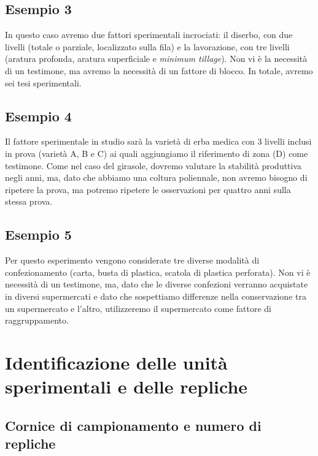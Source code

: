 \documentclass[a4paper,12pt,oneside]{book}
\theoremstyle{definition}
\theoremstyle{definition}
\theoremstyle{definition}
\theoremstyle{remark}
\begin{document}
\subsection{Esempio 3}\label{esempio-3}

In questo caso avremo due fattori sperimentali incrociati: il diserbo,
con due livelli (totale o parziale, localizzato sulla fila) e la
lavorazione, con tre livelli (aratura profonda, aratura superficiale e
\emph{minimum tillage}). Non vi è la necessità di un testimone, ma
avremo la necessità di un fattore di blocco. In totale, avremo sei tesi
sperimentali.

\subsection{Esempio 4}\label{esempio-4}

Il fattore sperimentale in studio sarà la varietà di erba medica con 3
livelli inclusi in prova (varietà A, B e C) ai quali aggiungiamo il
riferimento di zona (D) come testimone. Come nel caso del girasole,
dovremo valutare la stabilità produttiva negli anni, ma, dato che
abbiamo una coltura poliennale, non avremo bisogno di ripetere la prova,
ma potremo ripetere le osservazioni per quattro anni sulla stessa prova.

\subsection{Esempio 5}\label{esempio-5}

Per questo esperimento vengono considerate tre diverse modalità di
confezionamento (carta, busta di plastica, scatola di plastica
perforata). Non vi è necessità di un testimone, ma, dato che le diverse
confezioni verranno acquistate in diversi supermercati e dato che
sospettiamo differenze nella conservazione tra un supermercato e
l'altro, utilizzeremo il supermercato come fattore di raggruppamento.

\section{Identificazione delle unità sperimentali e delle
repliche}\label{identificazione-delle-unita-sperimentali-e-delle-repliche}

\subsection{Cornice di campionamento e numero di
repliche}\label{cornice-di-campionamento-e-numero-di-repliche}
\end{document}
